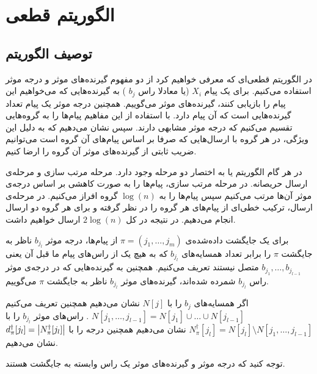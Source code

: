 \section{
    الگوریتم قطعی
}
\subsection{
    توصیف الگوریتم
}

در الگوریتم قطعی‌ای که معرفی خواهیم کرد از دو مفهوم گیرنده‌های موثر و درجه موثر استفاده می‌کنیم. برای یک پیام
$X_i$
(یا معادلا راس
$b_j$
)
به گیرنده‌هایی که می‌خواهیم این پیام را بازیابی کنند، گیرنده‌های موثر می‌گوییم. همچنین درجه موثر یک پیام تعداد گیرنده‌هایی است که آن پیام دارد. با استفاده از این مفاهیم پیام‌ها را به گروه‌هایی تقسیم می‌کنیم که درجه موثر مشابهی دارند. سپس نشان می‌دهیم که به دلیل این ویژگی، در هر گروه با ارسال‌هایی که صرفا بر اساس پیام‌های آن گروه است می‌توانیم ضریب ثابتی از گیرنده‌های موثر آن گروه را ارضا کنیم.

در هر گام الگوریتم
یا به اختصار
دو مرحله وجود دارد. مرحله مرتب سازی و مرحله‌ی ارسال حریصانه. در مرحله مرتب سازی، پیام‌ها را به صورت کاهشی بر اساس درجه‌ی موثر آن‌ها مرتب می‌کنیم سپس پیام‌ها را به
$\log(n)$
گروه افراز می‌کنیم. در مرحله‌ی ارسال، ترکیب خطی‌ای از پیام‌های هر گروه را در نظر گرفته و برای هر گروه دو ارسال انجام می‌دهیم. در نتیجه در کل
$2 \log(n)$
ارسال خواهیم داشت.

\begin{definition}
    برای یک جایگشت داده‌شده‌ی
    $\pi = (j_1, \ldots, j_m)$
    از پیام‌ها، درجه موثر
    $b_{j_l}$
    ناظر به جایگشت
    $\pi$
    را برابر تعداد همسایه‌های
    $b_{j_l}$
    که به هیچ یک از راس‌‌های پیام ما قبل آن یعنی
    $b_{j_1}, \ldots, b_{j_{l - 1}}$
    متصل نیستند تعریف می‌کنیم. همچنین به گیرنده‌هایی که در درجه‌ی موثر راس
    $b_{j_l}$
    شمرده شده‌اند، گیرنده‌های موثر
    $b_{j_l}$
    ناظر به جایگشت
    $\pi$
    می‌گوییم.
\end{definition}
\begin{notation}
    اگر همسایه‌های
    $b_j$
    را با
    $N[j]$
    نشان می‌دهیم همچنین تعریف می‌کنیم
    $N[j_1, \ldots, j_{l - 1}] = N[j_1] \cup \ldots \cup N[j_{l - 1}]$
    . راس‌های موثر
    $b_{j_l}$
    را با
    $N^\dagger_\pi [j_l] = N[j_l] \setminus N[j_1, \ldots, j_{l - 1}]$
    نشان می‌دهیم همچنین درجه را با
    $d^\dagger_\pi[j_l] = \left|{N^\dagger_\pi [j_l] }\right|$
    نشان می‌دهیم.
\end{notation}


توجه کنید که درجه موثر و گیرنده‌های موثر یک راس وابسته به جایگشت هستند.

